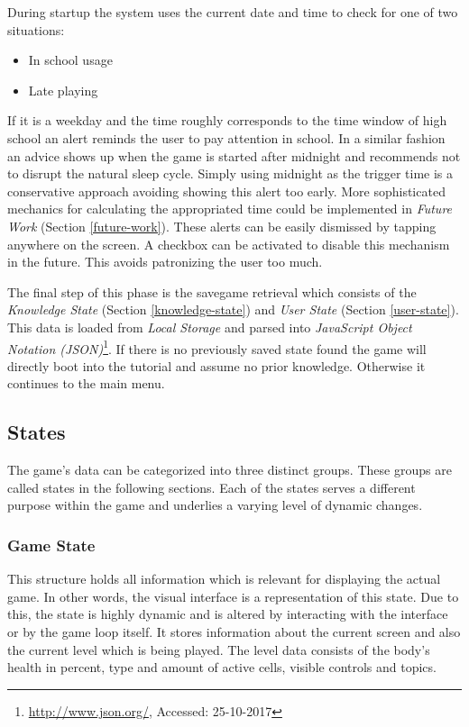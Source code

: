 During startup the system uses the current date and time to check for one of two situations:
\begin{itemize}
	\item In school usage
    \item Late playing
\end{itemize}
If it is a weekday and the time roughly corresponds to the time window of high school an alert reminds the user to pay attention in school. In a similar fashion an advice shows up when the game is started after midnight and recommends not to disrupt the natural sleep cycle. Simply using midnight as the trigger time is a conservative approach avoiding showing this alert too early. More sophisticated mechanics for calculating the appropriated time could be implemented in \textit{Future Work} (Section \ref{future-work}). These alerts can be easily dismissed by tapping anywhere on the screen. A checkbox can be activated to disable this mechanism in the future. This avoids patronizing the user too much.

The final step of this phase is the savegame retrieval which consists of the \textit{Knowledge State} (Section \ref{knowledge-state}) and \textit{User State} (Section \ref{user-state}). This data is loaded from \textit{Local Storage} and parsed into \textit{JavaScript Object Notation (JSON)}\footnote{\url{http://www.json.org/}, Accessed: 25-10-2017}. If there is no previously saved state found the game will directly boot into the tutorial and assume no prior knowledge. Otherwise it continues to the main menu.

\subsection{States}
The game's data can be categorized into three distinct groups. These groups are called states in the following sections. Each of the states serves a different purpose within the game and underlies a varying level of dynamic changes.

\subsubsection{Game State}
This structure holds all information which is relevant for displaying the actual game. In other words, the visual interface is a representation of this state. Due to this, the state is highly dynamic and is altered by interacting with the interface or by the game loop itself. It stores information about the current screen and also the current level which is being played. The level data consists of the body's health in percent, type and amount of active cells, visible controls and topics.

